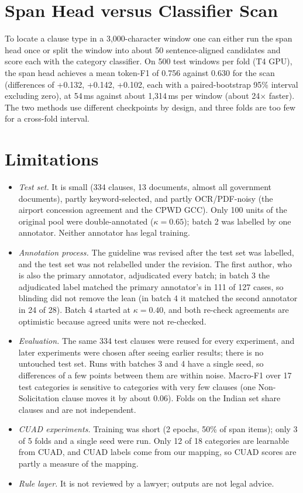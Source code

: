 \documentclass[conference]{IEEEtran}
\begin{document}
\section{Span Head versus Classifier Scan}\label{sec:scan}
To locate a clause type in a 3,000-character window one can either run the span head once or split the window into about 50 sentence-aligned candidates and score each with the category classifier. On 500 test windows per fold (T4 GPU), the span head achieves a mean token-F1 of 0.756 against 0.630 for the scan (differences of +0.132, +0.142, +0.102, each with a paired-bootstrap 95\% interval excluding zero), at 54\,ms against about 1,314\,ms per window (about 24$\times$ faster). The two methods use different checkpoints by design, and three folds are too few for a cross-fold interval.

\section{Limitations}\label{sec:limits}
\begin{itemize}
\item \emph{Test set.} It is small (334 clauses, 13 documents, almost all government documents), partly keyword-selected, and partly OCR/PDF-noisy (the airport concession agreement and the CPWD GCC). Only 100 units of the original pool were double-annotated ($\kappa=0.65$); batch 2 was labelled by one annotator. Neither annotator has legal training.
\item \emph{Annotation process.} The guideline was revised after the test set was labelled, and the test set was not relabelled under the revision. The first author, who is also the primary annotator, adjudicated every batch; in batch 3 the adjudicated label matched the primary annotator's in 111 of 127 cases, so blinding did not remove the lean (in batch 4 it matched the second annotator in 24 of 28). Batch 4 started at $\kappa=0.40$, and both re-check agreements are optimistic because agreed units were not re-checked.
\item \emph{Evaluation.} The same 334 test clauses were reused for every experiment, and later experiments were chosen after seeing earlier results; there is no untouched test set. Runs with batches 3 and 4 have a single seed, so differences of a few points between them are within noise. Macro-F1 over 17 test categories is sensitive to categories with very few clauses (one Non-Solicitation clause moves it by about 0.06). Folds on the Indian set share clauses and are not independent.
\item \emph{CUAD experiments.} Training was short (2 epochs, 50\% of span items); only 3 of 5 folds and a single seed were run. Only 12 of 18 categories are learnable from CUAD, and CUAD labels come from our mapping, so CUAD scores are partly a measure of the mapping.
\item \emph{Rule layer.} It is not reviewed by a lawyer; outputs are not legal advice.
\end{itemize}
\end{document}
